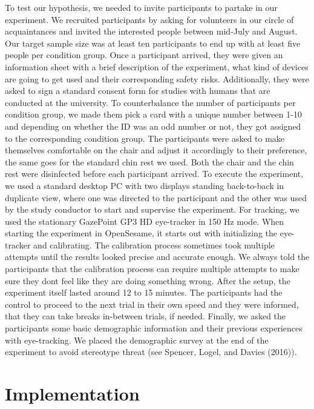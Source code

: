 \documentclass[
  12pt,
  letterpaper,
  DIV=11,
  numbers=noendperiod]{scrreprt}
\begin{document}
To test our hypothesis, we needed to invite participants to partake in
our experiment. We recruited participants by asking for volunteers in
our circle of acquaintances and invited the interested people between
mid-July and August. Our target sample size was at least ten
participants to end up with at least five people per condition group.
Once a participant arrived, they were given an information sheet with a
brief description of the experiment, what kind of devices are going to
get used and their corresponding safety risks. Additionally, they were
asked to sign a standard consent form for studies with humans that are
conducted at the university. To counterbalance the number of
participants per condition group, we made them pick a card with a unique
number between 1-10 and depending on whether the ID was an odd number or
not, they got assigned to the corresponding condition group. The
participants were asked to make themselves comfortable on the chair and
adjust it accordingly to their preference, the same goes for the
standard chin rest we used. Both the chair and the chin rest were
disinfected before each participant arrived. To execute the experiment,
we used a standard desktop PC with two displays standing back-to-back in
duplicate view, where one was directed to the participant and the other
was used by the study conductor to start and supervise the experiment.
For tracking, we used the stationary GazePoint GP3 HD eye-tracker in 150
Hz mode. When starting the experiment in OpenSesame, it starts out with
initializing the eye-tracker and calibrating. The calibration process
sometimes took multiple attempts until the results looked precise and
accurate enough. We always told the participants that the calibration
process can require multiple attempts to make sure they dont feel like
they are doing something wrong. After the setup, the experiment itself
lasted around 12 to 15 minutes. The participants had the control to
proceed to the next trial in their own speed and they were informed,
that they can take breaks in-between trials, if needed. Finally, we
asked the participants some basic demographic information and their
previous experiences with eye-tracking. We placed the demographic survey
at the end of the experiment to avoid stereotype threat (see Spencer,
Logel, and Davies (2016)).

\section{Implementation}\label{implementation}
\end{document}
